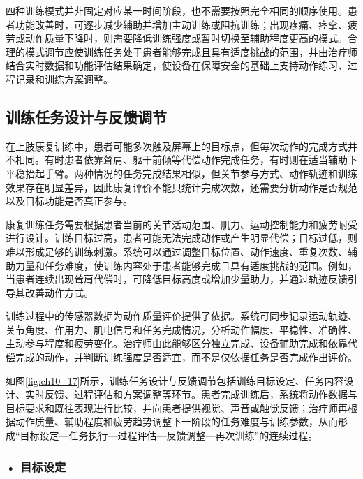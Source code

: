 四种训练模式并非固定对应某一时间阶段，也不需要按照完全相同的顺序使用。患者功能改善时，可逐步减少辅助并增加主动训练或阻抗训练；出现疼痛、痉挛、疲劳或动作质量下降时，则需要降低训练强度或暂时切换至辅助程度更高的模式。合理的模式调节应使训练任务处于患者能够完成且具有适度挑战的范围，并由治疗师结合实时数据和功能评估结果确定，使设备在保障安全的基础上支持动作练习、过程记录和训练方案调整。


\subsection{训练任务设计与反馈调节}

在上肢康复训练中，患者可能多次触及屏幕上的目标点，但每次动作的完成方式并不相同。有时患者依靠耸肩、躯干前倾等代偿动作完成任务，有时则在适当辅助下平稳抬起手臂。两种情况的任务完成结果相似，但关节参与方式、动作轨迹和训练效果存在明显差异，因此康复评价不能只统计完成次数，还需要分析动作是否规范以及目标功能是否真正参与。

康复训练任务需要根据患者当前的关节活动范围、肌力、运动控制能力和疲劳耐受进行设计。训练目标过高，患者可能无法完成动作或产生明显代偿；目标过低，则难以形成足够的训练刺激。系统可以通过调整目标位置、动作速度、重复次数、辅助力量和任务难度，使训练内容处于患者能够完成且具有适度挑战的范围。例如，当患者连续出现耸肩代偿时，可降低目标高度或增加少量助力，并通过轨迹反馈引导其改善动作方式。

训练过程中的传感器数据为动作质量评价提供了依据。系统可同步记录运动轨迹、关节角度、作用力、肌电信号和任务完成情况，分析动作幅度、平稳性、准确性、主动参与程度和疲劳变化。治疗师由此能够区分独立完成、设备辅助完成和依靠代偿完成的动作，并判断训练强度是否适宜，而不是仅依据任务是否完成作出评价。

如图\ref{fig:ch10_17}所示，训练任务设计与反馈调节包括训练目标设定、任务内容设计、实时反馈、过程评估和方案调整等环节。患者完成训练后，系统将动作数据与目标要求和既往表现进行比较，并向患者提供视觉、声音或触觉反馈；治疗师再根据动作质量、辅助程度和疲劳趋势调整下一阶段的任务难度与训练参数，从而形成“目标设定—任务执行—过程评估—反馈调整—再次训练”的连续过程。


\par
\noindent\begin{minipage}{\textwidth}
\centering
{}
\label{fig:ch10_17}
\end{minipage}
\par
\subsubsection*{\textbf{• 目标设定}}

